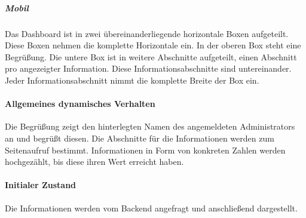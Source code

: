 \vspace{0.5em}
\begin{minipage}{\textwidth}
    \begin{minipage}{.5\textwidth}
        \subparagraph*{Mobil}
        Das Dashboard ist in zwei übereinanderliegende horizontale Boxen aufgeteilt. Diese Boxen nehmen die komplette Horizontale ein.
        In der oberen Box steht eine Begrüßung.
        Die untere Box ist in weitere Abschnitte aufgeteilt, einen Abschnitt pro angezeigter Information.
        Diese Informationsabschnitte sind untereinander.
        Jeder Informationsabschnitt nimmt die komplette Breite der Box ein.
    \end{minipage}
    \begin{minipage}{.5\textwidth}
        \hspace{.2\textwidth}
        \captionsetup[figure]{labelformat=empty}
        \captionsetup[figure]{labelformat=default}
    \end{minipage}
\end{minipage}
\vspace{0.5em}

\paragraph*{Allgemeines dynamisches Verhalten}
Die Begrüßung zeigt den hinterlegten Namen des angemeldeten Administrators an und begrüßt diesen.
Die Abschnitte für die Informationen werden zum Seitenaufruf bestimmt. 
Informationen in Form von konkreten Zahlen werden hochgezählt, bis diese ihren Wert erreicht haben.


\paragraph*{Initialer Zustand}
Die Informationen werden vom Backend angefragt und anschließend dargestellt.
